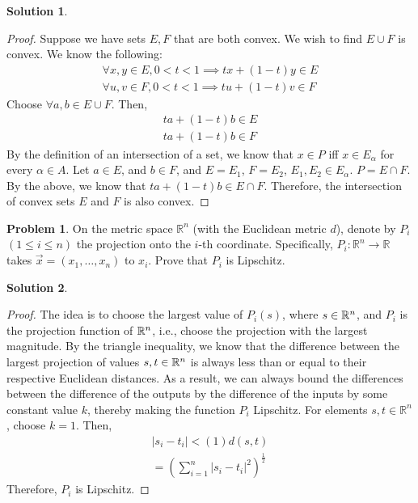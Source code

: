 \documentclass[12pt]{article}
\theoremstyle{definition} %
\newtheorem{solution}{Solution}
\newtheorem{problem}{Problem}
\theoremstyle{plain} %
\begin{document}
\begin{solution}
    \begin{proof}
        Suppose we have sets \(E,F\) that are both convex. We wish to find \(E\cup F\) is convex. We know the following:
        \begin{align}
            \forall x, y \in E, 0<t<1 \implies tx+(1-t)y\in E\\[10pt] 
            \forall u, v \in F, 0<t<1 \implies tu+(1-t)v \in F
        \end{align}
        Choose \(\forall a,b \in E\cup F\). Then,
        \begin{align}
            ta+(1-t)b\in E\\[10pt] 
            ta+(1-t)b \in F
        \end{align} 
        By the definition of an intersection of a set, we know that \(x\in P\) iff \(x\in E_{\alpha}\) for every \(\alpha \in A\). Let \(a \in E\), and \(b \in F\), and \(E = E_1\), \(F = E_2\), \(E_1, E_2 \in E_{\alpha}\). \(P=E\cap F\). By the above, we know that \(ta+(1-t)b\in E\cap F\). Therefore, the intersection of convex sets \(E\) and \(F\) is also convex.        
    \end{proof}
\end{solution}
\begin{problem}
On the metric space $\mathbb{R}^n$ (with the Euclidean metric $d$), denote by $P_i$ $(1 \leq i \leq n)$ the projection onto the $i$-th coordinate. Specifically, $P_i : \mathbb{R}^n \to \mathbb{R}$ takes $\vec{x} = (x_1, \dots, x_n)$ to $x_i$. Prove that $P_i$ is Lipschitz.
\end{problem}
\begin{solution}
    \begin{proof}
        The idea is to choose the largest value of \(P_i(s)\), where \(s\in \mathbb{\MakeUppercase{r}}^{n}\), and \(P_i\) is the projection function of \(\mathbb{\MakeUppercase{r}}^{n}\), i.e., choose the projection with the largest magnitude. By the triangle inequality, we know that the difference between the largest projection of values \(s, t \in \mathbb{\MakeUppercase{r}}^{n}\) is always less than or equal to their respective Euclidean distances. As a result, we can always bound the differences between the difference of the outputs by the difference of the inputs by some constant value \(k\), thereby making the function \(P_i\) Lipschitz. For elements \( s, t \in \mathbb{R}^{n} \), choose \(k=1\). Then,
        \begin{align}
            \left\vert s_i - t_i \right\vert < (1)d(s,t) \\[10pt] 
            =\left(  \sum_{i=1}^{n} \left\vert s_i - t_i \right\vert^{2}  \right)^{\frac{1}{2}}
        \end{align}
        Therefore, \(P_i\) is Lipschitz. 
         \end{proof}
\end{solution}
\end{document}
